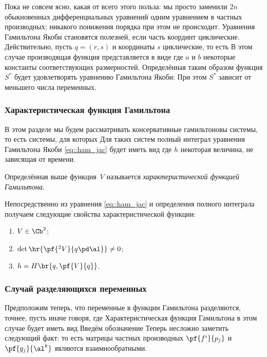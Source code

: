 \documentclass[a4paper,12pt]{article}
\newcommand{\tdf}[1]{\textsl{#1}}
\begin{document}
\begin{note}
Пока не совсем ясно, какая от всего этого польза: мы просто заменили $2n$ обыкновенных дифференциальных
уравнений одним уравнением в частных производных; никакого понижения порядка при этом не происходит.
Уравнения Гамильтона Якоби становятся полезней, если часть координт циклические. Действительно,
пусть $q=(r,s)$ и координаты $s$ циклические, то есть
В этом случае производящая функция представляется в виде
где $a$ и $b$ некоторые константы соответствующих размерностей. Определённая таким образом функция
$S^*$ будет удовлетворять уравнению Гамильтона Якоби:
При этом $S^*$ зависит от меньшего числа переменных.
\end{note}

\subsubsection{Характеристическая функция Гамильтона}

В этом разделе мы будем рассматривать консервативные гамильтоновы системы, то есть системы, для которых
 Для таких систем полный интеграл уравнения Гамильтона Якоби \eqref{eq::ham_jac} будет
иметь вид
где $h$ некоторая величина, не зависящая от времени.
\begin{df}
Определённая выше функция~$V$ называется \tdf{характеристической функцией Гамильтона}.
\end{df}
Непосредственно из уравнения \eqref{eq::ham_jac} и определения полного интеграла получаем следующие свойства
характеристической функции:
\begin{enumerate}
  \item $V\in \Cb^2$;
  \item $\det\hr{\pf{^2V}{q\pd\al}}\neq0$;
  \item $h=H\br{q,\pf{V}{q}}$.%
\end{enumerate}

\subsubsection{Случай разделяющихся переменных}

Предположим теперь, что переменные в функции Гамильтона разделяются, точнее, пусть
иначе говоря,
где
Характеристическая функция Гамильтона в этом случае будет иметь вид
Введём обозначение
Теперь несложно заметить следующий факт:
то есть матрицы частных производных $\pf{f^i}{p_j}$ и $\pf{g_j}{\al^k}$ являются взаимнообратными.
\end{document}
